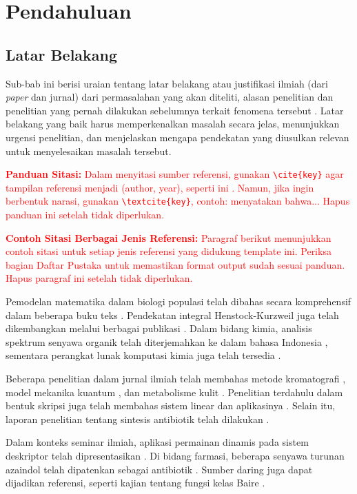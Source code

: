\chapter{Pendahuluan}

\section{Latar Belakang}

Sub-bab ini berisi uraian tentang latar belakang atau justifikasi ilmiah (dari \textit{paper} dan jurnal) dari permasalahan yang akan diteliti, alasan penelitian dan penelitian yang pernah dilakukan sebelumnya terkait fenomena tersebut . Latar belakang yang baik harus memperkenalkan masalah secara jelas, menunjukkan urgensi penelitian, dan menjelaskan mengapa pendekatan yang diusulkan relevan untuk menyelesaikan masalah tersebut.

\textcolor{red}{\textbf{Panduan Sitasi:} Dalam menyitasi sumber referensi, gunakan \texttt{\textbackslash cite\{key\}} agar tampilan referensi menjadi (author, year), seperti ini \cite{brauer2001}. Namun, jika ingin berbentuk narasi, gunakan \texttt{\textbackslash textcite\{key\}}, contoh: \textcite{cheney2001} menyatakan bahwa... Hapus panduan ini setelah tidak diperlukan.}

\textcolor{red}{\textbf{Contoh Sitasi Berbagai Jenis Referensi:} Paragraf berikut menunjukkan contoh sitasi untuk setiap jenis referensi yang didukung template ini. Periksa bagian Daftar Pustaka untuk memastikan format output sudah sesuai panduan. Hapus paragraf ini setelah tidak diperlukan.}

Pemodelan matematika dalam biologi populasi telah dibahas secara komprehensif dalam beberapa buku teks \cite{brauer2001, cheney2001, dai1989}. Pendekatan integral Henstock-Kurzweil juga telah dikembangkan melalui berbagai publikasi \cite{lee2000, lee1989}. Dalam bidang kimia, analisis spektrum senyawa organik telah diterjemahkan ke dalam bahasa Indonesia \cite{creswell1982}, sementara perangkat lunak komputasi kimia juga telah tersedia \cite{anonim1992}.

Beberapa penelitian dalam jurnal ilmiah telah membahas metode kromatografi \cite{davis1995}, model mekanika kuantum \cite{dewar1985}, dan metabolisme kulit \cite{finnen1987}. Penelitian terdahulu dalam bentuk skripsi juga telah membahas sistem linear dan aplikasinya \cite{husna2002}. Selain itu, laporan penelitian tentang sintesis antibiotik telah dilakukan \cite{jumina2001}.

Dalam konteks seminar ilmiah, aplikasi permainan dinamis pada sistem deskriptor telah dipresentasikan \cite{salmah2006}. Di bidang farmasi, beberapa senyawa turunan azaindol telah dipatenkan sebagai antibiotik \cite{wang2003}. Sumber daring juga dapat dijadikan referensi, seperti kajian tentang fungsi kelas Baire \cite{leung2000}.

